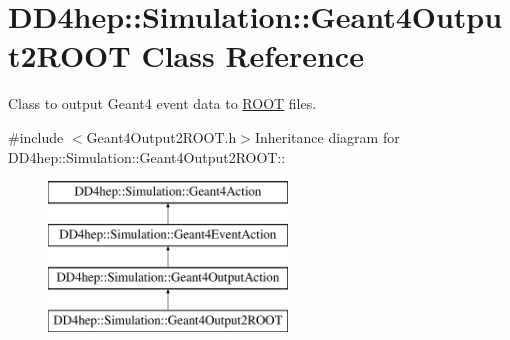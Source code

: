 \hypertarget{class_d_d4hep_1_1_simulation_1_1_geant4_output2_r_o_o_t}{
\section{DD4hep::Simulation::Geant4Output2ROOT Class Reference}
\label{class_d_d4hep_1_1_simulation_1_1_geant4_output2_r_o_o_t}
}


Class to output Geant4 event data to \hyperlink{namespace_r_o_o_t}{ROOT} files.  


{\ttfamily \#include $<$Geant4Output2ROOT.h$>$}Inheritance diagram for DD4hep::Simulation::Geant4Output2ROOT::\begin{figure}[H]
\begin{center}
\leavevmode
\includegraphics[height=4cm]{class_d_d4hep_1_1_simulation_1_1_geant4_output2_r_o_o_t}
\end{center}
\end{figure}
